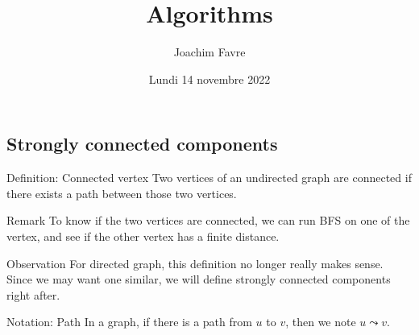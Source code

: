 \documentclass[a4paper]{article}
\title{Algorithms}
\author{Joachim Favre}
\date{Lundi 14 novembre 2022}
\begin{document}
\maketitle


\subsection{Strongly connected components}
\begin{parag}{Definition: Connected vertex}
    Two vertices of an undirected graph are connected if there exists a path between those two vertices.

    \begin{subparag}{Remark}
        To know if the two vertices are connected, we can run BFS on one of the vertex, and see if the other vertex has a finite distance. 
    \end{subparag}

    \begin{subparag}{Observation}
        For directed graph, this definition no longer really makes sense. Since we may want one similar, we will define strongly connected components right after.
    \end{subparag}
\end{parag}

\begin{parag}{Notation: Path}
    In a graph, if there is a path from $u$ to $v$, then we note $u \leadsto v$.
\end{parag}
\end{document}
